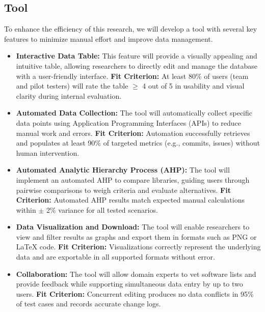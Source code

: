 \documentclass{article}
\begin{document}
\subsection{Tool}
To enhance the efficiency of this research, we will develop a tool with several key features to minimize manual effort and improve data management.
\begin{itemize}
    \item \textbf{Interactive Data Table:} This feature will provide a visually appealing and intuitive table, allowing researchers to directly edit and manage the database with a user-friendly interface. \textbf{Fit Criterion:} At least 80\% of users (team and pilot testers) will rate the table $\geq$ 4 out of 5 in usability and visual clarity during internal evaluation.
    \item \textbf{Automated Data Collection:} The tool will automatically collect specific data points using Application Programming Interfaces (APIs) to reduce manual work and errors. \textbf{Fit Criterion:} Automation successfully retrieves and populates at least 90\% of targeted metrics (e.g., commits, issues) without human intervention.
    \item \textbf{Automated Analytic Hierarchy Process (AHP):} The tool will implement an automated AHP to compare libraries, guiding users through pairwise comparisons to weigh criteria and evaluate alternatives. \textbf{Fit Criterion:} Automated AHP results match expected manual calculations within $\pm$ 2\% variance for all tested scenarios.
    \item \textbf{Data Visualization and Download:} The tool will enable researchers to view and filter results as graphs and export them in formats such as PNG or LaTeX code. \textbf{Fit Criterion:} Visualizations correctly represent the underlying data and are exportable in all supported formats without error.
    \item \textbf{Collaboration:} The tool will allow domain experts to vet software lists and provide feedback while supporting simultaneous data entry by up to two users. \textbf{Fit Criterion:} Concurrent editing produces no data conflicts in 95\% of test cases and records accurate change logs.
\end{itemize}
\end{document}
